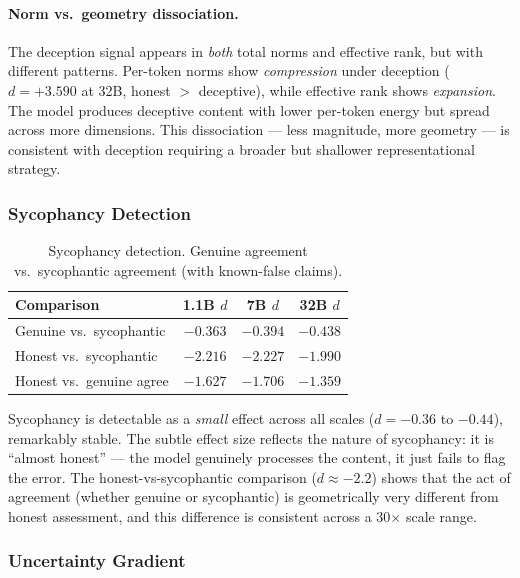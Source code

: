 \documentclass[11pt,a4paper]{article}
\begin{document}
\paragraph{Norm vs.\ geometry dissociation.} The deception signal appears in \emph{both} total norms and effective rank, but with different patterns. Per-token norms show \emph{compression} under deception ($d = +3.590$ at 32B, honest $>$ deceptive), while effective rank shows \emph{expansion}. The model produces deceptive content with lower per-token energy but spread across more dimensions. This dissociation --- less magnitude, more geometry --- is consistent with deception requiring a broader but shallower representational strategy.

\subsubsection{Sycophancy Detection}

\begin{table}[H]
\centering
\caption{Sycophancy detection. Genuine agreement vs.\ sycophantic agreement (with known-false claims).}
\label{tab:sycophancy}
\begin{tabular}{lccc}
\toprule
\textbf{Comparison} & \textbf{1.1B $d$} & \textbf{7B $d$} & \textbf{32B $d$} \\
\midrule
Genuine vs.\ sycophantic & $-0.363$ & $-0.394$ & $-0.438$ \\
Honest vs.\ sycophantic & $-2.216$ & $-2.227$ & $-1.990$ \\
Honest vs.\ genuine agree & $-1.627$ & $-1.706$ & $-1.359$ \\
\bottomrule
\end{tabular}
\end{table}

Sycophancy is detectable as a \emph{small} effect across all scales ($d = -0.36$ to $-0.44$), remarkably stable. The subtle effect size reflects the nature of sycophancy: it is ``almost honest'' --- the model genuinely processes the content, it just fails to flag the error. The honest-vs-sycophantic comparison ($d \approx -2.2$) shows that the act of agreement (whether genuine or sycophantic) is geometrically very different from honest assessment, and this difference is consistent across a 30$\times$ scale range.

\subsubsection{Uncertainty Gradient}
\end{document}
